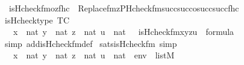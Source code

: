 \begin{isabellebody}
\ \ {\isachardoublequoteopen}is{\isacharunderscore}{\kern0pt}Hcheck{\isacharunderscore}{\kern0pt}fm{\isacharparenleft}{\kern0pt}o{\isacharcomma}{\kern0pt}z{\isacharcomma}{\kern0pt}f{\isacharcomma}{\kern0pt}hc{\isacharparenright}{\kern0pt}\ {\isasymequiv}\ Replace{\isacharunderscore}{\kern0pt}fm{\isacharparenleft}{\kern0pt}z{\isacharcomma}{\kern0pt}PHcheck{\isacharunderscore}{\kern0pt}fm{\isacharparenleft}{\kern0pt}succ{\isacharparenleft}{\kern0pt}succ{\isacharparenleft}{\kern0pt}o{\isacharparenright}{\kern0pt}{\isacharparenright}{\kern0pt}{\isacharcomma}{\kern0pt}succ{\isacharparenleft}{\kern0pt}succ{\isacharparenleft}{\kern0pt}f{\isacharparenright}{\kern0pt}{\isacharparenright}{\kern0pt}{\isacharcomma}{\kern0pt}{}{\isacharcomma}{\kern0pt}{}{\isacharparenright}{\kern0pt}{\isacharcomma}{\kern0pt}hc{\isacharparenright}{\kern0pt}{\isachardoublequoteclose}\isanewline
\isanewline
{}\isamarkupfalse%
\ is{\isacharunderscore}{\kern0pt}Hcheck{\isacharunderscore}{\kern0pt}type\ {\isacharbrackleft}{\kern0pt}TC{\isacharbrackright}{\kern0pt}{\isacharcolon}{\kern0pt}\isanewline
\ \ {\isachardoublequoteopen}{\isasymlbrakk}\ x\ {\isasymin}\ nat{\isacharsemicolon}{\kern0pt}\ y\ {\isasymin}\ nat{\isacharsemicolon}{\kern0pt}\ z\ {\isasymin}\ nat{\isacharsemicolon}{\kern0pt}\ u\ {\isasymin}\ nat\ {\isasymrbrakk}\ {\isasymLongrightarrow}\ is{\isacharunderscore}{\kern0pt}Hcheck{\isacharunderscore}{\kern0pt}fm{\isacharparenleft}{\kern0pt}x{\isacharcomma}{\kern0pt}y{\isacharcomma}{\kern0pt}z{\isacharcomma}{\kern0pt}u{\isacharparenright}{\kern0pt}\ {\isasymin}\ formula{\isachardoublequoteclose}\isanewline
%
\isadelimproof
\ \ %
\endisadelimproof
%
\isatagproof
{}\isamarkupfalse%
\ {\isacharparenleft}{\kern0pt}simp\ add{\isacharcolon}{\kern0pt}is{\isacharunderscore}{\kern0pt}Hcheck{\isacharunderscore}{\kern0pt}fm{\isacharunderscore}{\kern0pt}def{\isacharparenright}{\kern0pt}%
\endisatagproof
{\isafoldproof}%
%
\isadelimproof
\isanewline
%
\endisadelimproof
\isanewline
{}\isamarkupfalse%
\ sats{\isacharunderscore}{\kern0pt}is{\isacharunderscore}{\kern0pt}Hcheck{\isacharunderscore}{\kern0pt}fm\ {\isacharbrackleft}{\kern0pt}simp{\isacharbrackright}{\kern0pt}{\isacharcolon}{\kern0pt}\isanewline
\ \ {\isachardoublequoteopen}{\isasymlbrakk}\ x\ {\isasymin}\ nat{\isacharsemicolon}{\kern0pt}\ y\ {\isasymin}\ nat{\isacharsemicolon}{\kern0pt}\ z\ {\isasymin}\ nat{\isacharsemicolon}{\kern0pt}\ u\ {\isasymin}\ nat\ {\isacharsemicolon}{\kern0pt}\ env\ {\isasymin}\ list{\isacharparenleft}{\kern0pt}M{\isacharparenright}{\kern0pt}{\isasymrbrakk}\isanewline

\end{isabellebody}
